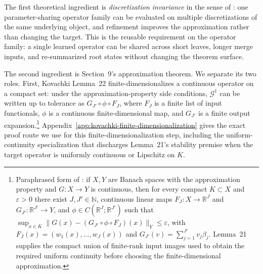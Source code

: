 The first theoretical ingredient is \emph{discretization invariance} in
the sense of \citet[Section~2.3]{Kovachki23NeuralOperator}: one
parameter-sharing operator family can be evaluated on multiple
discretizations of the same underlying object, and refinement improves
the approximation rather than changing the target. This is the
reusable requirement on the operator family: a single
learned operator can be shared across short leaves, longer merge inputs,
and re-summarized root states without changing the theorem surface.

The second ingredient is Section~9's approximation theorem. We separate
its two roles. First, Kovachki Lemma~22 finite-dimensionalizes a
continuous operator on a compact set: under the approximation-property
side conditions, $\mathcal{G}^\dagger$ can be written up to tolerance as
$G_{J'}\circ\phi\circ F_J$, where $F_J$ is a finite list of input
functionals, $\phi$ is a continuous finite-dimensional map, and $G_{J'}$
is a finite output expansion.\footnote{Paraphrased form of
\citet[Lemma~22]{Kovachki23NeuralOperator}: if $X,Y$ are Banach spaces
with the approximation property and $G:X\to Y$ is continuous, then for
every compact $K\subset X$ and $\varepsilon>0$ there exist
$J,J'\in\mathbb{N}$, continuous linear maps
$F_J:X\to\mathbb{R}^J$ and $G_{J'}:\mathbb{R}^{J'}\to Y$, and
$\phi\in C(\mathbb{R}^J;\mathbb{R}^{J'})$ such that
$\sup_{x\in K}\|G(x)-(G_{J'}\circ\phi\circ F_J)(x)\|_Y\le\varepsilon$,
with $F_J(x)=(w_1(x),\ldots,w_J(x))$ and
$G_{J'}(v)=\sum_{j=1}^{J'}v_j\beta_j$. Lemma~21 supplies the compact
union of finite-rank input images used to obtain the required uniform
continuity before choosing the finite-dimensional approximation.}
Appendix~\ref{app:kovachki-finite-dimensionalization} gives the exact proof
route we use for this finite-dimensionalization step, including the
uniform-continuity specialization that discharges Lemma~21's stability
premise when the target operator is uniformly continuous or Lipschitz on
$K$.

